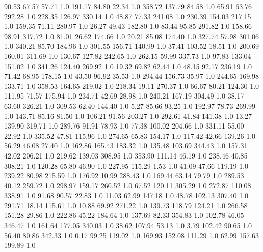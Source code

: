    90.53    67.57    57.71  1.0
  191.17    84.80    22.34  1.0
  358.72   137.79    84.58  1.0
   65.91    63.76   292.28  1.0
  228.35   126.97   330.14  1.0
   48.87    77.33   241.08  1.0
  230.39   154.03   217.15  1.0
  159.35    71.11   280.97  1.0
   26.27    49.43   182.80  1.0
   83.44    95.85   291.82  1.0
  158.66    98.91   317.72  1.0
   81.01    26.62   174.66  1.0
   20.21    85.08   174.40  1.0
  327.74    57.98   301.06  1.0
  340.21    85.70   184.96  1.0
  301.55   156.71   140.99  1.0
   37.41   103.52    18.51  1.0
  200.69   160.01   311.69  1.0
  130.67   127.82   242.65  1.0
  262.15    59.99   337.73  1.0
   97.83   133.04   151.02  1.0
  341.26   124.40   269.92  1.0
   19.32    69.82    62.44  1.0
   48.15    92.17   236.19  1.0
   71.42    68.95   178.15  1.0
   43.50    96.92    35.53  1.0
  294.44   156.73    35.97  1.0
  244.65   169.98   133.71  1.0
  358.53   164.65   219.02  1.0
  218.34    19.11   270.37  1.0
   66.67    80.21   124.30  1.0
  111.95    71.57   175.94  1.0
  234.71    42.69    28.98  1.0
  240.21   167.19   304.49  1.0
   38.17    63.60   326.21  1.0
  309.53    62.40   144.40  1.0
    5.27    85.66    93.25  1.0
  192.97    78.73   269.99  1.0
  143.71    85.16    81.50  1.0
  106.21    91.56   203.27  1.0
  292.61    41.84   141.38  1.0
   13.27   139.90   319.71  1.0
  289.76    91.91    78.93  1.0
   77.38   100.02   204.66  1.0
  331.11    55.00    22.92  1.0
  335.52    47.81   115.96  1.0
  274.65    65.83   154.17  1.0
  117.42    42.66   139.26  1.0
   56.29    46.08    27.40  1.0
  162.86   165.43   183.32  1.0
  135.48   103.69   344.43  1.0
  157.31    42.02   206.21  1.0
  219.62   139.03   308.95  1.0
  353.90   111.14    46.19  1.0
  238.46    40.85   308.21  1.0
  120.28    65.80    46.90  1.0
  227.95   115.29     1.53  1.0
   41.09    47.66   119.19  1.0
  239.22    80.98   215.59  1.0
  176.92    10.99   288.43  1.0
  169.44    63.14    79.79  1.0
  289.53    40.12   259.72  1.0
  298.97   159.17   260.52  1.0
   67.52   120.11   305.29  1.0
  272.87   110.08   338.91  1.0
   91.68    90.57    22.83  1.0
   11.03    62.99   147.18  1.0
   48.78   102.13   307.40  1.0
  291.71    18.14   115.61  1.0
   10.88    69.92   271.22  1.0
  139.73   118.79   124.21  1.0
  266.58   151.28    29.86  1.0
  222.86    45.22   184.64  1.0
  137.69    82.33   354.83  1.0
  102.78    46.05   346.47  1.0
  161.64   177.05   340.03  1.0
   38.62   107.94    53.13  1.0
    3.79   102.42    90.65  1.0
   56.40    80.86   342.33  1.0
    0.17    99.25   119.02  1.0
  169.93   152.08   111.29  1.0
   62.99   157.63   199.89  1.0
